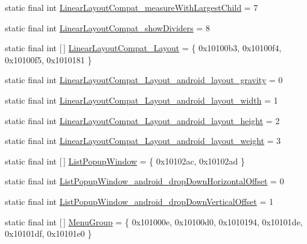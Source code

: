 \begin{DoxyCompactItemize}
static final int \mbox{\hyperlink{classcom_1_1synnapps_1_1carouselview_1_1_r_1_1styleable_aca072590831d8e1b1604bcc46b2cc9f4}{Linear\+Layout\+Compat\+\_\+measure\+With\+Largest\+Child}} = 7
\item 
static final int \mbox{\hyperlink{classcom_1_1synnapps_1_1carouselview_1_1_r_1_1styleable_a503e48781d1445e59be8c95bb78d57c4}{Linear\+Layout\+Compat\+\_\+show\+Dividers}} = 8
\item 
static final int \mbox{[}$\,$\mbox{]} \mbox{\hyperlink{classcom_1_1synnapps_1_1carouselview_1_1_r_1_1styleable_ad34c3dac54872c04bbcc67c0cadaeb95}{Linear\+Layout\+Compat\+\_\+\+Layout}} = \{ 0x10100b3, 0x10100f4, 0x10100f5, 0x1010181 \}
\item 
static final int \mbox{\hyperlink{classcom_1_1synnapps_1_1carouselview_1_1_r_1_1styleable_a2ab0ec46101ea596b60fa2e20d58d59c}{Linear\+Layout\+Compat\+\_\+\+Layout\+\_\+android\+\_\+layout\+\_\+gravity}} = 0
\item 
static final int \mbox{\hyperlink{classcom_1_1synnapps_1_1carouselview_1_1_r_1_1styleable_abd6e0efda9ca797dbe8f5170baca2af1}{Linear\+Layout\+Compat\+\_\+\+Layout\+\_\+android\+\_\+layout\+\_\+width}} = 1
\item 
static final int \mbox{\hyperlink{classcom_1_1synnapps_1_1carouselview_1_1_r_1_1styleable_a24bf70a0280aa5167d2c35a2d455dfa2}{Linear\+Layout\+Compat\+\_\+\+Layout\+\_\+android\+\_\+layout\+\_\+height}} = 2
\item 
static final int \mbox{\hyperlink{classcom_1_1synnapps_1_1carouselview_1_1_r_1_1styleable_a70810746268df903dea6118bcf070160}{Linear\+Layout\+Compat\+\_\+\+Layout\+\_\+android\+\_\+layout\+\_\+weight}} = 3
\item 
static final int \mbox{[}$\,$\mbox{]} \mbox{\hyperlink{classcom_1_1synnapps_1_1carouselview_1_1_r_1_1styleable_a75f8ed17f1e79578bd936a2f454e65b4}{List\+Popup\+Window}} = \{ 0x10102ac, 0x10102ad \}
\item 
static final int \mbox{\hyperlink{classcom_1_1synnapps_1_1carouselview_1_1_r_1_1styleable_a5671c3c9c9c0a7d30d87c0b321ca99a8}{List\+Popup\+Window\+\_\+android\+\_\+drop\+Down\+Horizontal\+Offset}} = 0
\item 
static final int \mbox{\hyperlink{classcom_1_1synnapps_1_1carouselview_1_1_r_1_1styleable_a985a6e97b658ce947aece4bbbea2655b}{List\+Popup\+Window\+\_\+android\+\_\+drop\+Down\+Vertical\+Offset}} = 1
\item 
static final int \mbox{[}$\,$\mbox{]} \mbox{\hyperlink{classcom_1_1synnapps_1_1carouselview_1_1_r_1_1styleable_ab99fa0d809324a623056afd53e423307}{Menu\+Group}} = \{ 0x101000e, 0x10100d0, 0x1010194, 0x10101de, 0x10101df, 0x10101e0 \}

\end{DoxyCompactItemize}

